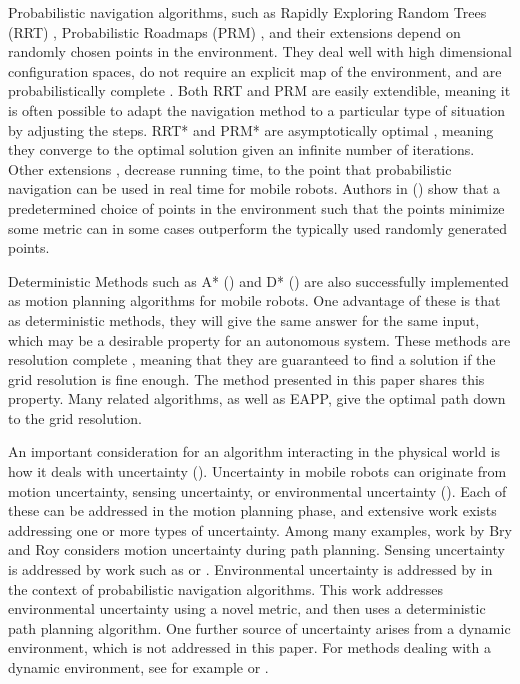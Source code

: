 \documentclass[journal]{IEEEtran}
\begin{document}
Probabilistic navigation algorithms, such as Rapidly Exploring Random Trees (RRT) \cite{RRT}, Probabilistic Roadmaps (PRM) \cite{PRM}, and their extensions depend on randomly chosen points in the environment. 
They deal well with high dimensional configuration spaces, do not require an explicit map of the environment, and are probabilistically complete \cite{Planning Algorithms - LaValle}. 
Both RRT and PRM are easily extendible, meaning it is often possible to adapt the navigation method to a particular type of situation by adjusting the steps.
RRT* and PRM* are asymptotically optimal \cite{RRT*}, meaning they converge to the optimal solution given an infinite number of iterations.
Other extensions \cite{double trees}, \cite{heuristic bias} decrease running time, to the point that probabilistic navigation can be used in real time for mobile robots. 
Authors in (\cite{ Lavalle, Branicky, Lindemann}) show that a predetermined choice of points in the environment such that the points minimize some metric can in some cases outperform the typically used randomly generated points. 

Deterministic Methods such as A* (\cite{A*}) and D* (\cite{D*}) are also successfully implemented as motion planning algorithms for mobile robots. 
One advantage of these is that as deterministic methods, they will give the same answer for the same input, which may be a desirable property for an autonomous system.
These methods are resolution complete \cite{ A* paper}, meaning that they are guaranteed to find a solution if the grid resolution is fine enough. 
The method presented in this paper shares this property. 
Many related algorithms, as well as EAPP, give the optimal path down to the grid resolution.

An important consideration for an algorithm interacting in the physical world is how it deals with uncertainty (\cite {Probabilistic Robotics}). 
Uncertainty in mobile robots can originate from motion uncertainty, sensing uncertainty, or environmental uncertainty (\cite{LQG-MP paper}). 
Each of these can be addressed in the motion planning phase, and extensive work exists addressing one or more types of uncertainty. 
Among many examples, work by Bry and Roy \cite{belief space} considers motion uncertainty during path planning. 
Sensing uncertainty is addressed by work such as \cite{(Luders et al. - Bounds on Tracking Error Using Closed Loop RRTs)} or \cite{(LQG-MP)}. 
Environmental uncertainty is addressed by \cite{(Roughness based RRT,} \cite{ particle filter RRT)} in the context of probabilistic navigation algorithms. 
This work addresses environmental uncertainty using a novel metric, and then uses a deterministic path planning algorithm. 
One further source of uncertainty arises from a dynamic environment, which is not addressed in this paper. 
For methods dealing with a dynamic environment, see for example \cite{(Frazzoli- Motion Planning with Moving Obstacles)} or \cite{(Likhachev and Koenig - Fast Replanning for navigation in unknown environment)}.
\end{document}
